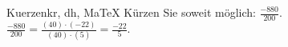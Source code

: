 \begin{MAufgabe}{Kuerzen}{kr, dh, MaTeX}
K\"urzen Sie soweit m\"oglich: $\frac{-880}{200}$.\\ 
\ifLsg\MLoesung
\quad $\frac{-880}{200}=\frac{(40)\cdot(-22)}{(40)\cdot(5)}=\frac{-22}{5}$.\else\relax\fi
 \end{MAufgabe}